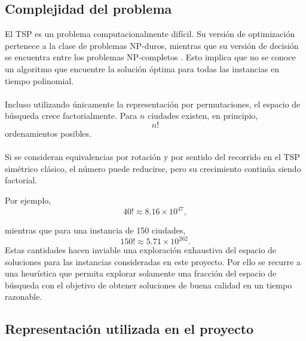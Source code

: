 \documentclass[12pt]{article}
\begin{document}
\subsection{Complejidad del problema}

El TSP es un problema computacionalmente difícil. Su versión de
optimización pertenece a la clase de problemas NP-duros, mientras que su
versión de decisión se encuentra entre los problemas NP-completos
\cite{garey1979computers}. Esto implica que no se conoce un algoritmo que
encuentre la solución óptima para todas las instancias en tiempo polinomial.
\\\\
Incluso utilizando únicamente la representación por permutaciones, el
espacio de búsqueda crece factorialmente. Para \(n\) ciudades existen, en
principio,
\[
    n!
\]
ordenamientos posibles. 
\\\\
Si se consideran equivalencias por rotación y por
sentido del recorrido en el TSP simétrico clásico, el número puede reducirse,
pero su crecimiento continúa siendo factorial.

Por ejemplo,
\[
    40!
    \approx
    8.16\times 10^{47},
\]

mientras que para una instancia de 150 ciudades,
\[
    150!
    \approx
    5.71\times 10^{262}.
\]
Estas cantidades hacen inviable una exploración exhaustiva del espacio de
soluciones para las instancias consideradas en este proyecto. Por ello se
recurre a una heurística que permita explorar solamente una fracción del
espacio de búsqueda con el objetivo de obtener soluciones de buena calidad
en un tiempo razonable.

\subsection{Representación utilizada en el proyecto}
\end{document}
